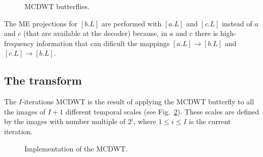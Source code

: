 \begin{figure}
  \centering {}
  
  
  
  \caption{MCDWT butterflies.}
  \label{fig:forward_butterflies}
\end{figure}

The ME projections for $[b.L]$ are performed with $[a.L]$ and $[c.L]$
instead of $a$ and $c$ (that are available at the decoder) because, in
$a$ and $c$ there is high-frequency information that can dificult the
mappings $[a.L]\rightarrow [b.L]$ and $[c.L]\rightarrow [b.L]$.



\subsection{The transform}
The $I$-iterations MCDWT is the result of applying the MCDWT butterfly
to all the images of $I+1$ different temporal scales (see
Fig.~\ref{fig:MCDWT}). These scales are defined by the images with
number multiple of $2^i$, where $1\leq i\leq I$ is the current
iteration.

\begin{figure}
  \centering
  
  
  \caption{Implementation of the MCDWT.}
  \label{fig:MCDWT}
\end{figure}

